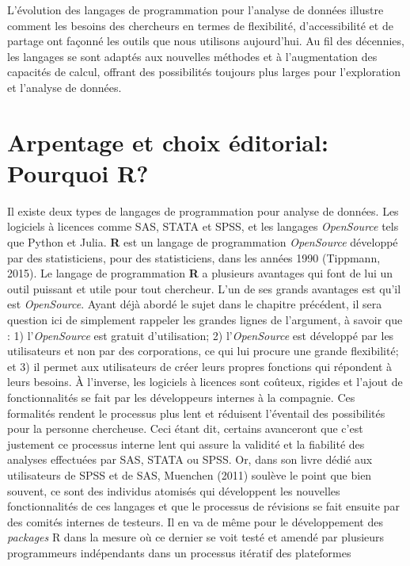 \documentclass[
  letterpaper,
  DIV=11,
  numbers=noendperiod]{scrreprt}
\begin{document}
L'évolution des langages de programmation pour l'analyse de données
illustre comment les besoins des chercheurs en termes de flexibilité,
d'accessibilité et de partage ont façonné les outils que nous utilisons
aujourd'hui. Au fil des décennies, les langages se sont adaptés aux
nouvelles méthodes et à l'augmentation des capacités de calcul, offrant
des possibilités toujours plus larges pour l'exploration et l'analyse de
données.

\section{Arpentage et choix éditorial: Pourquoi
R?}\label{arpentage-et-choix-uxe9ditorial-pourquoi-r}

Il existe deux types de langages de programmation pour analyse de
données. Les logiciels à licences comme SAS, STATA et SPSS, et les
langages \emph{OpenSource} tels que Python et Julia. \textbf{R} est un
langage de programmation \emph{OpenSource} développé par des
statisticiens, pour des statisticiens, dans les années 1990 (Tippmann,
2015). Le langage de programmation \textbf{R} a plusieurs avantages qui
font de lui un outil puissant et utile pour tout chercheur. L'un de ses
grands avantages est qu'il est \emph{OpenSource}. Ayant déjà abordé le
sujet dans le chapitre précédent, il sera question ici de simplement
rappeler les grandes lignes de l'argument, à savoir que : 1)
l'\emph{OpenSource} est gratuit d'utilisation; 2) l'\emph{OpenSource}
est développé par les utilisateurs et non par des corporations, ce qui
lui procure une grande flexibilité; et 3) il permet aux utilisateurs de
créer leurs propres fonctions qui répondent à leurs besoins. À
l'inverse, les logiciels à licences sont coûteux, rigides et l'ajout de
fonctionnalités se fait par les développeurs internes à la compagnie.
Ces formalités rendent le processus plus lent et réduisent l'éventail
des possibilités pour la personne chercheuse. Ceci étant dit, certains
avanceront que c'est justement ce processus interne lent qui assure la
validité et la fiabilité des analyses effectuées par SAS, STATA ou SPSS.
Or, dans son livre dédié aux utilisateurs de SPSS et de SAS, Muenchen
(2011) soulève le point que bien souvent, ce sont des individus atomisés
qui développent les nouvelles fonctionnalités de ces langages et que le
processus de révisions se fait ensuite par des comités internes de
testeurs. Il en va de même pour le développement des \emph{packages} R
dans la mesure où ce dernier se voit testé et amendé par plusieurs
programmeurs indépendants dans un processus itératif des plateformes
\end{document}
